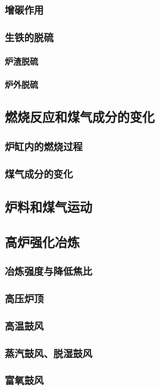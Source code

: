 \documentclass[UTF8]{../../ApplicationUniverse}
\begin{document}
        \subsubsection{增碳作用}
        \subsubsection{生铁的脱硫}
            \paragraph{炉渣脱硫}
            \paragraph{炉外脱硫}
    \subsection{燃烧反应和煤气成分的变化}
        \subsubsection{炉缸内的燃烧过程}
        \subsubsection{煤气成分的变化}
    \subsection{炉料和煤气运动}
    \subsection{高炉强化冶炼}
        \subsubsection{冶炼强度与降低焦比}
        \subsubsection{高压炉顶}
        \subsubsection{高温鼓风}
        \subsubsection{蒸汽鼓风、脱湿鼓风}
        \subsubsection{富氧鼓风}
\end{document}
